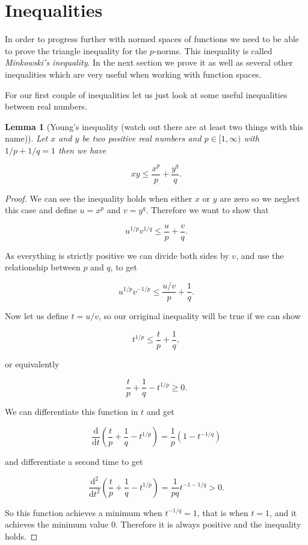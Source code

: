 \documentclass[
]{book}
\newtheorem{lemma}{Lemma}[chapter]
\theoremstyle{definition}
\theoremstyle{definition}
\theoremstyle{definition}
\theoremstyle{definition}
\theoremstyle{remark}
\begin{document}
\hypertarget{inequalities}{%
\section{Inequalities}\label{inequalities}}

In order to progress further with normed spaces of functions we need to be able to prove the triangle inequality for the \(p\)-norms. This inequality is called \emph{Minkowski's inequality}. In the next section we prove it as well as several other inequalities which are very useful when working with function spaces.

For our first couple of inequalities let us just look at some useful inequalities between real numbers.

\begin{lemma}[Young's inequality (watch out there are at least two things with this name)]
Let \(x\) and \(y\) be two positive real numbers and \(p \in [1, \infty)\) with \(1/p +1/q = 1\) then we have

\[ xy \leq \frac{x^p}{p} + \frac{y^q}{q}. \]
\end{lemma}

\begin{proof}
We can see the inequality holds when either \(x\) or \(y\) are zero so we neglect this case and define \(u = x^p\) and \(v = y^q\). Therefore we want to show that

\[ u^{1/p}v^{1/q} \leq \frac{u}{p} + \frac{v}{q}. \]

As everything is strictly positive we can divide both sides by \(v\), and use the relationship between \(p\) and \(q\), to get

\[ u^{1/p}v^{-1/p} \leq \frac{u/v}{p} + \frac{1}{q}. \]

Now let us define \(t = u/v\), so our orriginal inequality will be true if we can show

\[ t^{1/p} \leq \frac{t}{p} + \frac{1}{q}, \]

or equivalently

\[ \frac{t}{p} + \frac{1}{q} - t^{1/p} \geq 0. \]

We can differentiate this function in \(t\) and get

\[ \frac{\mathrm{d}}{\mathrm{d}t} \left(  \frac{t}{p} + \frac{1}{q} - t^{1/p}\right) = \frac{1}{p}(1- t^{-1/q}) \]

and differentiate a second time to get

\[  \frac{\mathrm{d}^2}{\mathrm{d}t^2} \left(  \frac{t}{p} + \frac{1}{q} - t^{1/p}\right)  =\frac{1}{pq} t^{-1-1/q} >0.\]

So this function achieves a minimum when \(t^{-1/q} = 1\), that is when \(t=1\), and it achieves the minimum value 0. Therefore it is always positive and the inequality holds.
\end{proof}
\end{document}
